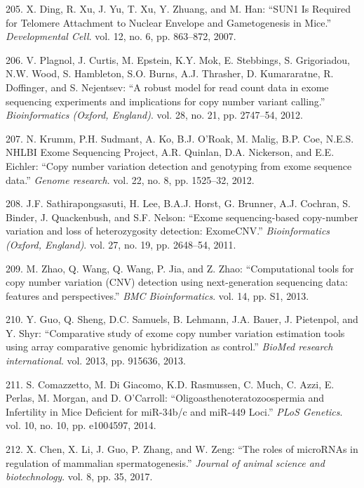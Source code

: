 \documentclass[12pt,a4paper,twoside]{ugathesis}
\theoremstyle{definition}
\theoremstyle{definition}
\theoremstyle{definition}
\theoremstyle{remark}
\begin{document}
\hypertarget{ref-Ding2007}{}
205. X. Ding, R. Xu, J. Yu, T. Xu, Y. Zhuang, and M. Han: ``SUN1 Is
Required for Telomere Attachment to Nuclear Envelope and Gametogenesis
in Mice.'' \emph{Developmental Cell}. vol. 12, no. 6, pp. 863--872,
2007.

\hypertarget{ref-Plagnol2012}{}
206. V. Plagnol, J. Curtis, M. Epstein, K.Y. Mok, E. Stebbings, S.
Grigoriadou, N.W. Wood, S. Hambleton, S.O. Burns, A.J. Thrasher, D.
Kumararatne, R. Doffinger, and S. Nejentsev: ``A robust model for read
count data in exome sequencing experiments and implications for copy
number variant calling.'' \emph{Bioinformatics (Oxford, England)}. vol.
28, no. 21, pp. 2747--54, 2012.

\hypertarget{ref-Krumm2012}{}
207. N. Krumm, P.H. Sudmant, A. Ko, B.J. O'Roak, M. Malig, B.P. Coe,
N.E.S. NHLBI Exome Sequencing Project, A.R. Quinlan, D.A. Nickerson, and
E.E. Eichler: ``Copy number variation detection and genotyping from
exome sequence data.'' \emph{Genome research}. vol. 22, no. 8, pp.
1525--32, 2012.

\hypertarget{ref-Sathirapongsasuti2011}{}
208. J.F. Sathirapongsasuti, H. Lee, B.A.J. Horst, G. Brunner, A.J.
Cochran, S. Binder, J. Quackenbush, and S.F. Nelson: ``Exome
sequencing-based copy-number variation and loss of heterozygosity
detection: ExomeCNV.'' \emph{Bioinformatics (Oxford, England)}. vol. 27,
no. 19, pp. 2648--54, 2011.

\hypertarget{ref-Zhao2013}{}
209. M. Zhao, Q. Wang, Q. Wang, P. Jia, and Z. Zhao: ``Computational
tools for copy number variation (CNV) detection using next-generation
sequencing data: features and perspectives.'' \emph{BMC Bioinformatics}.
vol. 14, pp. S1, 2013.

\hypertarget{ref-Guo2013}{}
210. Y. Guo, Q. Sheng, D.C. Samuels, B. Lehmann, J.A. Bauer, J.
Pietenpol, and Y. Shyr: ``Comparative study of exome copy number
variation estimation tools using array comparative genomic hybridization
as control.'' \emph{BioMed research international}. vol. 2013, pp.
915636, 2013.

\hypertarget{ref-Comazzetto2014}{}
211. S. Comazzetto, M. Di Giacomo, K.D. Rasmussen, C. Much, C. Azzi, E.
Perlas, M. Morgan, and D. O'Carroll: ``Oligoasthenoteratozoospermia and
Infertility in Mice Deficient for miR-34b/c and miR-449 Loci.''
\emph{PLoS Genetics}. vol. 10, no. 10, pp. e1004597, 2014.

\hypertarget{ref-Chen2017}{}
212. X. Chen, X. Li, J. Guo, P. Zhang, and W. Zeng: ``The roles of
microRNAs in regulation of mammalian spermatogenesis.'' \emph{Journal of
animal science and biotechnology}. vol. 8, pp. 35, 2017.
\end{document}
